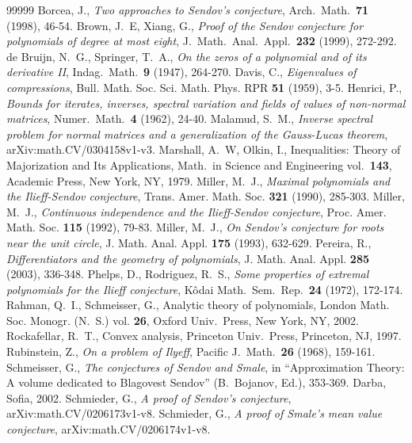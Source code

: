 \documentclass[10pt,twoside,a4paper,reqno]{amsart}
\theoremstyle{plain}
\theoremstyle{definition}
\begin{document}
\begin{thebibliography}{99999}
Borcea, J., {\em Two approaches to Sendov's conjecture}, 
Arch.~Math.~{\bf 71} (1998), 46-54.
Brown, J.~E, Xiang, G., {\em Proof of the Sendov conjecture for polynomials of 
degree at most eight}, J.~Math.~Anal.~Appl.~{\bf 232} (1999), 272-292.
de Bruijn, N.~G., Springer, T.~A., {\em On the zeros of a polynomial and of 
its derivative II}, Indag.~Math.~{\bf 9} (1947), 264-270.
Davis, C., {\em Eigenvalues of compressions}, 
Bull. Math. Soc. Sci. Math. Phys. RPR {\bf 51} (1959), 3-5.
Henrici, P., {\em Bounds for iterates, inverses, spectral variation and 
fields of values of non-normal matrices}, Numer.~Math.~{\bf 4} (1962), 24-40.
Malamud, S.~M., {\em Inverse spectral problem for normal matrices and a 
generalization of the Gauss-Lucas theorem}, arXiv:math.CV/0304158v1-v3.
Marshall, A.~W, Olkin, I., Inequalities: Theory of Majorization and Its 
Applications, Math.~in Science and Engineering vol.~{\bf 143}, Academic Press, 
New York, NY, 1979.
Miller, M.~J., {\em Maximal polynomials and the Ilieff-Sendov conjecture}, 
Trans. Amer. Math. Soc. {\bf 321} (1990), 285-303.
Miller, M.~J., {\em Continuous independence and the Ilieff-Sendov 
conjecture}, Proc. Amer. Math. Soc. {\bf 115} (1992), 79-83.
Miller, M.~J., {\em On Sendov's conjecture for roots near the unit circle}, 
J. Math. Anal. Appl. {\bf 175} (1993), 632-629.
Pereira, R., {\em Differentiators and the geometry of polynomials}, 
J. Math. Anal. Appl. {\bf 285} (2003), 336-348.
Phelps, D., Rodriguez, R.~S., {\em Some properties of extremal polynomials 
for the Ilieff conjecture}, K\^odai Math.~Sem.~Rep.~{\bf 24} (1972), 172-174.
Rahman, Q.~I., Schmeisser, G., Analytic theory of polynomials, London 
Math. Soc. Monogr. (N.~S.) vol. {\bf 26}, Oxford Univ.~Press, New York, 
NY, 2002.
Rockafellar, R.~T., Convex analysis, Princeton Univ.~Press, Princeton, NJ, 
1997.
Rubinstein, Z., {\em On a problem of Ilyeff}, Pacific J.~Math.~{\bf 26} 
(1968), 159-161.
Schmeisser, G., {\em The conjectures of Sendov and Smale}, in ``Approximation 
Theory: A volume dedicated to Blagovest Sendov'' (B.~Bojanov, Ed.), 353-369. 
Darba, Sofia, 2002. 
Schmieder, G., {\em A proof of Sendov's conjecture}, 
arXiv:math.CV/0206173v1-v8.
Schmieder, G., {\em A proof of Smale's mean value conjecture}, 
arXiv:math.CV/0206174v1-v8.

\end{thebibliography}
\end{document}
